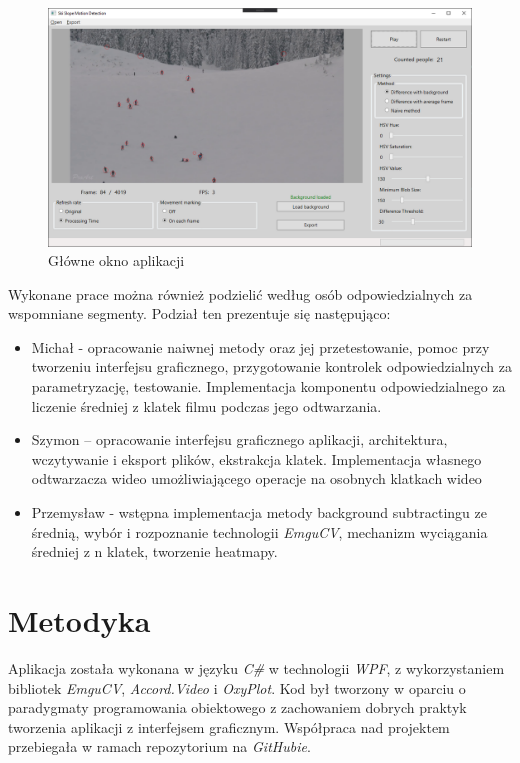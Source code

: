 \documentclass[a4paper]{article}
\begin{document}
\begin{figure}[H]
  \includegraphics[width=\linewidth]{resources/img5.png}
  \caption{Główne okno aplikacji}
\end{figure}
Wykonane prace można również podzielić według osób odpowiedzialnych za wspomniane segmenty. Podział ten prezentuje się następująco: 
\begin{itemize}
\item Michał - opracowanie naiwnej metody oraz jej przetestowanie, pomoc przy tworzeniu interfejsu graficznego, przygotowanie kontrolek odpowiedzialnych za parametryzację, testowanie. Implementacja komponentu odpowiedzialnego za liczenie średniej z klatek filmu podczas jego odtwarzania. 
\item Szymon – opracowanie interfejsu graficznego aplikacji, architektura, wczytywanie i eksport plików, ekstrakcja klatek. Implementacja własnego odtwarzacza wideo umożliwiającego operacje na osobnych klatkach wideo
\item Przemysław - wstępna implementacja metody background subtractingu ze średnią, wybór i rozpoznanie technologii \textit{EmguCV}, mechanizm wyciągania średniej z n klatek, tworzenie heatmapy.
\end{itemize}

\section{Metodyka}
Aplikacja została wykonana w języku \textit{C\#} w technologii \textit{WPF}, z wykorzystaniem bibliotek \textit{EmguCV}, \textit{Accord.Video} i \textit{OxyPlot}. Kod był tworzony w oparciu o paradygmaty programowania obiektowego z zachowaniem dobrych praktyk tworzenia aplikacji z interfejsem graficznym. Współpraca nad projektem przebiegała w ramach repozytorium na \textit{GitHubie}. 
\end{document}
